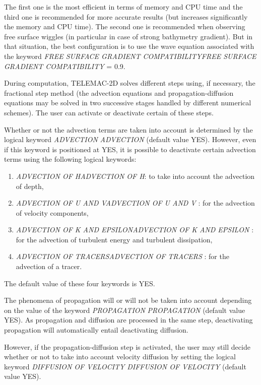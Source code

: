 \documentclass{article} %
\begin{document}
 The first one is the most efficient in terms of memory and CPU time and the third one is recommended for more accurate results (but increases significantly the memory and CPU time). The second one is recommended when observing free surface wiggles (in particular in case of strong bathymetry gradient). But in that situation, the best configuration is to use the wave equation associated with the keyword \textit{FREE SURFACE GRADIENT COMPATIBILITYFREE SURFACE GRADIENT COMPATIBILITY} = 0.9.

 During computation, TELEMAC-2D solves different steps using, if necessary, the fractional step method (the advection equations and propagation-diffusion equations may be solved in two successive stages handled by different numerical schemes). The user can activate or deactivate certain of these steps.

 Whether or not the advection terms are taken into account is determined by the logical keyword \textit{ADVECTION} \textit{ADVECTION} (default value YES). However, even if this keyword is positioned at YES, it is possible to deactivate certain advection terms using the following logical keywords:

\begin{enumerate}
\item  \textit{ADVECTION OF HADVECTION OF H}: to take into account the advection of depth,

\item  \textit{ADVECTION OF U AND VADVECTION OF U AND V} : for the advection of velocity components,

\item  \textit{ADVECTION OF K AND EPSILONADVECTION OF K AND EPSILON} : for the advection of turbulent energy and turbulent dissipation,

\item  \textit{ADVECTION OF TRACERSADVECTION OF TRACERS} : for the advection of a tracer.
\end{enumerate}

 The default value of these four keywords is YES.

 The phenomena of propagation will or will not be taken into account depending on the value of the keyword \textit{PROPAGATION} \textit{PROPAGATION} (default value YES). As propagation and diffusion are processed in the same step, deactivating propagation will automatically entail deactivating diffusion.

 However, if the propagation-diffusion step is activated, the user may still decide whether or not to take into account velocity diffusion by setting the logical keyword \textit{DIFFUSION OF VELOCITY} \textit{DIFFUSION OF VELOCITY} (default value YES).
\end{document}
